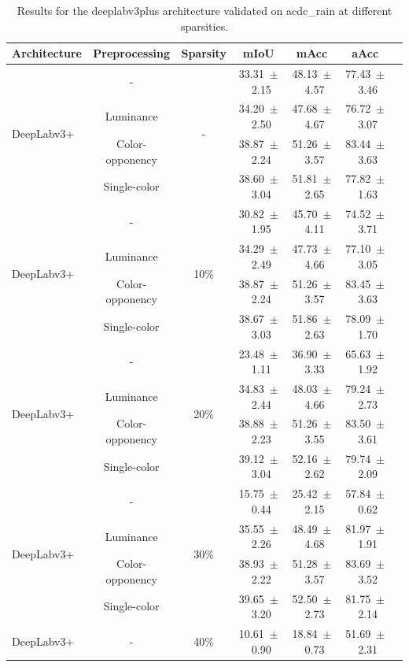 \begin{table}[h]
\centering
\caption{Results for the deeplabv3plus architecture validated on acdc_rain at different sparsities.}
\begin{tabular}{@{}lccc ccc@{}}
\toprule
Architecture & Preprocessing & Sparsity & mIoU & mAcc & aAcc \\
\midrule

\multirow{4}{*}{DeepLabv3+} & - & \multirow{4}{*}{-} & 33.31~$\pm$~2.15 & 48.13~$\pm$~4.57 & 77.43~$\pm$~3.46 \\
& Luminance & & 34.20~$\pm$~2.50 & 47.68~$\pm$~4.67 & 76.72~$\pm$~3.07 \\
& Color-opponency & & 38.87~$\pm$~2.24 & 51.26~$\pm$~3.57 & 83.44~$\pm$~3.63 \\
& Single-color & & 38.60~$\pm$~3.04 & 51.81~$\pm$~2.65 & 77.82~$\pm$~1.63 \\
\midrule
\multirow{4}{*}{DeepLabv3+} & - & \multirow{4}{*}{10\%} & 30.82~$\pm$~1.95 & 45.70~$\pm$~4.11 & 74.52~$\pm$~3.71 \\
& Luminance & & 34.29~$\pm$~2.49 & 47.73~$\pm$~4.66 & 77.10~$\pm$~3.05 \\
& Color-opponency & & 38.87~$\pm$~2.24 & 51.26~$\pm$~3.57 & 83.45~$\pm$~3.63 \\
& Single-color & & 38.67~$\pm$~3.03 & 51.86~$\pm$~2.63 & 78.09~$\pm$~1.70 \\
\midrule
\multirow{4}{*}{DeepLabv3+} & - & \multirow{4}{*}{20\%} & 23.48~$\pm$~1.11 & 36.90~$\pm$~3.33 & 65.63~$\pm$~1.92 \\
& Luminance & & 34.83~$\pm$~2.44 & 48.03~$\pm$~4.66 & 79.24~$\pm$~2.73 \\
& Color-opponency & & 38.88~$\pm$~2.23 & 51.26~$\pm$~3.55 & 83.50~$\pm$~3.61 \\
& Single-color & & 39.12~$\pm$~3.04 & 52.16~$\pm$~2.62 & 79.74~$\pm$~2.09 \\
\midrule
\multirow{4}{*}{DeepLabv3+} & - & \multirow{4}{*}{30\%} & 15.75~$\pm$~0.44 & 25.42~$\pm$~2.15 & 57.84~$\pm$~0.62 \\
& Luminance & & 35.55~$\pm$~2.26 & 48.49~$\pm$~4.68 & 81.97~$\pm$~1.91 \\
& Color-opponency & & 38.93~$\pm$~2.22 & 51.28~$\pm$~3.57 & 83.69~$\pm$~3.52 \\
& Single-color & & 39.65~$\pm$~3.20 & 52.50~$\pm$~2.73 & 81.75~$\pm$~2.14 \\
\midrule
\multirow{4}{*}{DeepLabv3+} & - & \multirow{4}{*}{40\%} & 10.61~$\pm$~0.90 & 18.84~$\pm$~0.73 & 51.69~$\pm$~2.31 \\

\end{tabular}
\end{table}
